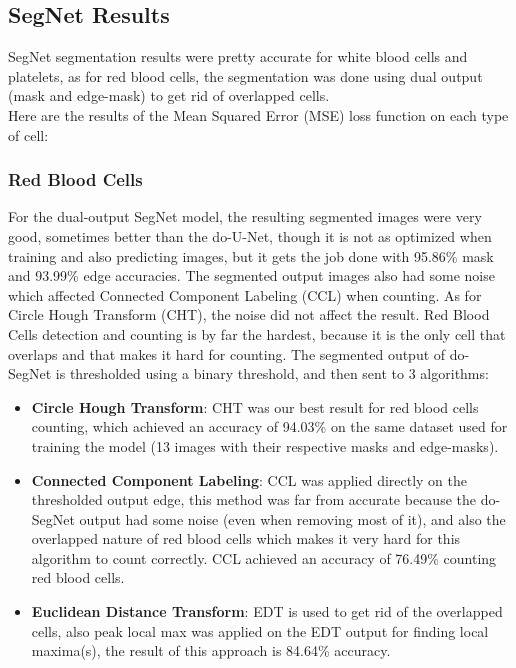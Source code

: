 \documentclass[conference]{IEEEtran}
\begin{document}
\subsection{SegNet Results}
\hspace{\parindent}
SegNet segmentation results were pretty accurate for white blood cells and platelets, as for red blood cells, the segmentation was done using dual output (mask and edge-mask) to get rid of overlapped cells.\\
Here are the results of the Mean Squared Error (MSE) loss function on each type of cell:


\subsubsection{Red Blood Cells}
\hspace{\parindent}
For the dual-output SegNet model, the resulting segmented images were very good, sometimes better than the do-U-Net, though it is not as optimized when training and also predicting images, but it gets the job done with 95.86\% mask and 93.99\% edge accuracies. The segmented output images also had some noise which affected Connected Component Labeling (CCL) when counting.
As for Circle Hough Transform (CHT), the noise did not affect the result.
Red Blood Cells detection and counting is by far the hardest, because it is the only cell that overlaps and that makes it hard for counting.
The segmented output of do-SegNet is thresholded using a binary threshold, and then sent to 3 algorithms:

\begin{itemize}
  \item \textbf{Circle Hough Transform}: CHT was our best result for red blood cells counting, which achieved an accuracy of 94.03\% on the same dataset used for training the model (13 images with their respective masks and edge-masks).
  \item \textbf{Connected Component Labeling}: CCL was applied directly on the thresholded output edge, this method was far from accurate because the do-SegNet output had some noise (even when removing most of it), and also the overlapped nature of red blood cells which makes it very hard for this algorithm to count correctly. CCL achieved an accuracy of 76.49\% counting red blood cells.
  \item \textbf{Euclidean Distance Transform}: EDT is used to get rid of the overlapped cells, also peak local max was applied on the EDT output for finding local maxima(s), the result of this approach is 84.64\% accuracy.
\end{itemize}
\end{document}
